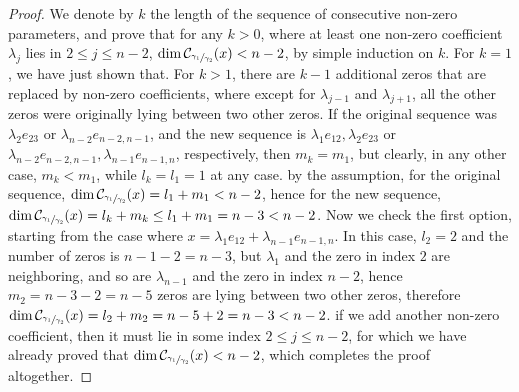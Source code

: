 \documentclass[12pt]{article}
\begin{document}
\begin{proof}
We denote by $k$ the length of the sequence of consecutive non-zero parameters, and prove that for any $k>0$, where at least one non-zero coefficient $\lambda_j$ lies in $2\leq j\leq n-2$, $\dim\mathcal{C}_{\sfrac{\gamma_1}{\gamma_2}}(x)<n-2$, by simple induction on $k$. For $k=1$, we have just shown that. For $k>1$, there are $k-1$ additional zeros that are replaced by non-zero coefficients, where except for $\lambda_{j-1}$ and $\lambda_{j+1}$, all the other zeros were originally lying between two other zeros. If the original sequence was $\lambda_2 e_{23}$ or $\lambda_{n-2}e_{n-2,n-1}$, and the new sequence is $\lambda_1 e_{12},\lambda_2 e_{23}$ or $\lambda_{n-2}e_{n-2,n-1},\lambda_{n-1}e_{n-1,n}$, respectively, then $m_k=m_1$, but clearly, in any other case, $m_k<m_1$, while $l_k=l_1=1$ at any case. by the assumption, for the original sequence, $\dim\mathcal{C}_{\sfrac{\gamma_1}{\gamma_2}}(x)=l_1+m_1<n-2$, hence for the new sequence, $\dim\mathcal{C}_{\sfrac{\gamma_1}{\gamma_2}}(x)=l_k+m_k\leq l_1+m_1=n-3<n-2$. Now we check the first option, starting from the case where $x=\lambda_1 e_{12}+\lambda_{n-1}e_{n-1,n}$. In this case, $l_2=2$ and the number of zeros is $n-1-2=n-3$, but $\lambda_1$ and the zero in index $2$ are neighboring, and so are $\lambda_{n-1}$ and the zero in index $n-2$, hence $m_2=n-3-2=n-5$ zeros are lying between two other zeros, therefore $\dim\mathcal{C}_{\sfrac{\gamma_1}{\gamma_2}}(x)=l_2+m_2=n-5+2=n-3<n-2$. if we add another non-zero coefficient, then it must lie in some index $2\leq j\leq n-2$, for which we have already proved that $\dim\mathcal{C}_{\sfrac{\gamma_1}{\gamma_2}}(x)<n-2$, which completes the proof altogether.
\end{proof}
\end{document}
